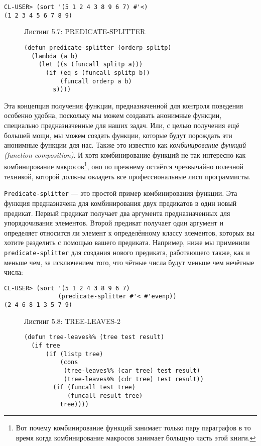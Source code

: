 \begin{verbatim}
CL-USER> (sort '(5 1 2 4 3 8 9 6 7) #'<)
(1 2 3 4 5 6 7 8 9)
\end{verbatim}

\begin{figure}Листинг 5.7: PREDICATE-SPLITTER\label{listing_5.7}
\listbegin
\begin{verbatim}
(defun predicate-splitter (orderp splitp)
  (lambda (a b)
    (let ((s (funcall splitp a)))
      (if (eq s (funcall splitp b))
          (funcall orderp a b)
        s))))
\end{verbatim}
\listend
\end{figure}

Эта концепция получения функции, предназначенной для контроля поведения особенно удобна, поскольку мы можем создавать анонимные функции, специально предназначенные для наших задач. Или, с целью получения ещё большей мощи, мы можем создать функции, которые будут порождать эти анонимные функции для нас. Также это известно как \emph{комбинирование функций (function composition)}. И хотя комбинирование функций не так интересно как комбинирование макросов\footnote{Вот почему комбинирование функций занимает только пару параграфов в то время когда комбинирование макросов занимает большую часть этой книги.}, оно по прежнему остаётся чрезвычайно полезной техникой, которой должны овладеть все профессиональные лисп программисты.



\verb"Predicate-splitter" --- это простой пример комбинирования функции. Эта функция предназначена для комбинирования двух предикатов в один новый предикат. Первый предикат получает два аргумента предназначенных для упорядочивания элементов. Второй предикат получает один аргумент и определяет относится ли элемент к определённому классу элементов, которых вы хотите разделить с помощью вашего предиката. Например, ниже мы применили \verb"predicate-splitter" для создания нового предиката, работающего также, как и меньше чем, за исключением того, что чётные числа будут меньше чем нечётные числа:

\begin{verbatim}
CL-USER> (sort '(5 1 2 4 3 8 9 6 7)
               (predicate-splitter #'< #'evenp))
(2 4 6 8 1 3 5 7 9)
\end{verbatim}

\begin{figure}Листинг 5.8: TREE-LEAVES-2\label{listing_5.8}
\listbegin
\begin{verbatim}
(defun tree-leaves%% (tree test result)
  (if tree
      (if (listp tree)
          (cons
           (tree-leaves%% (car tree) test result)
           (tree-leaves%% (cdr tree) test result))
        (if (funcall test tree)
            (funcall result tree)
          tree))))
\end{verbatim}
\listend
\end{figure}

